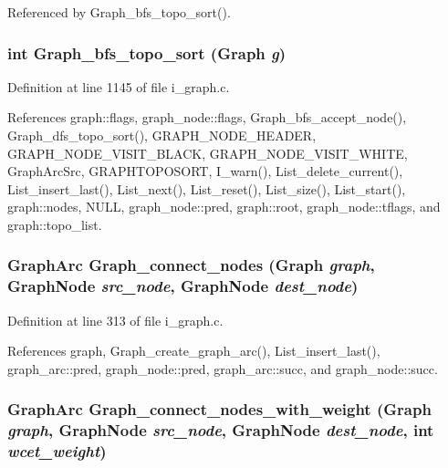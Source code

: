Referenced by Graph\_\-bfs\_\-topo\_\-sort().
\subsubsection{\setlength{\rightskip}{0pt plus 5cm}int Graph\_\-bfs\_\-topo\_\-sort (\bf{Graph} {\em g})}\label{i__graph_8c_39ebf281b4e83d35958ac7741a1bff92}




Definition at line 1145 of file i\_\-graph.c.

References graph::flags, graph\_\-node::flags, Graph\_\-bfs\_\-accept\_\-node(), Graph\_\-dfs\_\-topo\_\-sort(), GRAPH\_\-NODE\_\-HEADER, GRAPH\_\-NODE\_\-VISIT\_\-BLACK, GRAPH\_\-NODE\_\-VISIT\_\-WHITE, Graph\-Arc\-Src, GRAPHTOPOSORT, I\_\-warn(), List\_\-delete\_\-current(), List\_\-insert\_\-last(), List\_\-next(), List\_\-reset(), List\_\-size(), List\_\-start(), graph::nodes, NULL, graph\_\-node::pred, graph::root, graph\_\-node::tflags, and graph::topo\_\-list.
\subsubsection{\setlength{\rightskip}{0pt plus 5cm}\bf{Graph\-Arc} Graph\_\-connect\_\-nodes (\bf{Graph} {\em graph}, \bf{Graph\-Node} {\em src\_\-node}, \bf{Graph\-Node} {\em dest\_\-node})}\label{i__graph_8c_3850703f4565c65fa3b4fc1d80f76b69}




Definition at line 313 of file i\_\-graph.c.

References graph, Graph\_\-create\_\-graph\_\-arc(), List\_\-insert\_\-last(), graph\_\-arc::pred, graph\_\-node::pred, graph\_\-arc::succ, and graph\_\-node::succ.
\subsubsection{\setlength{\rightskip}{0pt plus 5cm}\bf{Graph\-Arc} Graph\_\-connect\_\-nodes\_\-with\_\-weight (\bf{Graph} {\em graph}, \bf{Graph\-Node} {\em src\_\-node}, \bf{Graph\-Node} {\em dest\_\-node}, int {\em wcet\_\-weight})}\label{i__graph_8c_17c05e9d6088587f89bed7df00e64d85}




